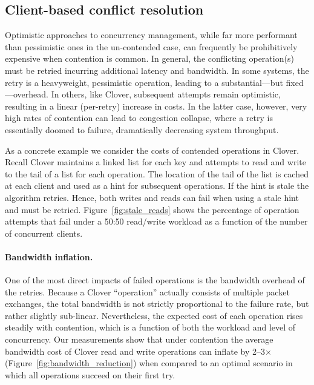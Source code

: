 \subsection{Client-based conflict resolution}

Optimistic approaches to concurrency management, while far more
performant than pessimistic ones in the un-contended case, can
frequently be prohibitively expensive when contention is common.  In
general, the conflicting operation(s) must be retried incurring
additional latency and bandwidth.  In some systems, the retry is a
heavyweight, pessimistic operation, leading to a substantial---but
fixed---overhead.  In others, like Clover, subsequent attempts remain
optimistic, resulting in a linear (per-retry) increase in costs.
In the latter case, however, very high rates of contention can lead to
congestion collapse, where a retry is essentially doomed to failure,
dramatically decreasing system throughput.

As a concrete example we consider the costs of contended operations in
Clover.  Recall Clover maintains a linked list for each key and
attempts to read and write to the tail of a list for each
operation. The location of the tail of the list is cached at each
client and used as a hint for subsequent operations.  If the hint is stale the algorithm retries.  Hence, both writes and reads can
fail when using a stale hint and must be retried.
Figure~\ref{fig:stale_reads} shows the percentage of operation
attempts that fail under a 50:50 read/write workload as a function of
the number of concurrent clients.

\paragraph{Bandwidth inflation.} 

One of the most direct impacts of failed operations is the bandwidth
overhead of the retries.  Because a Clover ``operation'' actually
consists of multiple packet exchanges, the total bandwidth is not
strictly proportional to the failure rate, but rather slightly
sub-linear.  Nevertheless, the expected cost of each operation rises
steadily with contention, which is a function of both the workload and
level of concurrency.  Our measurements show that under contention the
average bandwidth cost of Clover read and write operations can inflate
by 2--3$\times$ (Figure~\ref{fig:bandwidth_reduction}) when compared
to an optimal scenario in which all operations succeed on their first
try.

